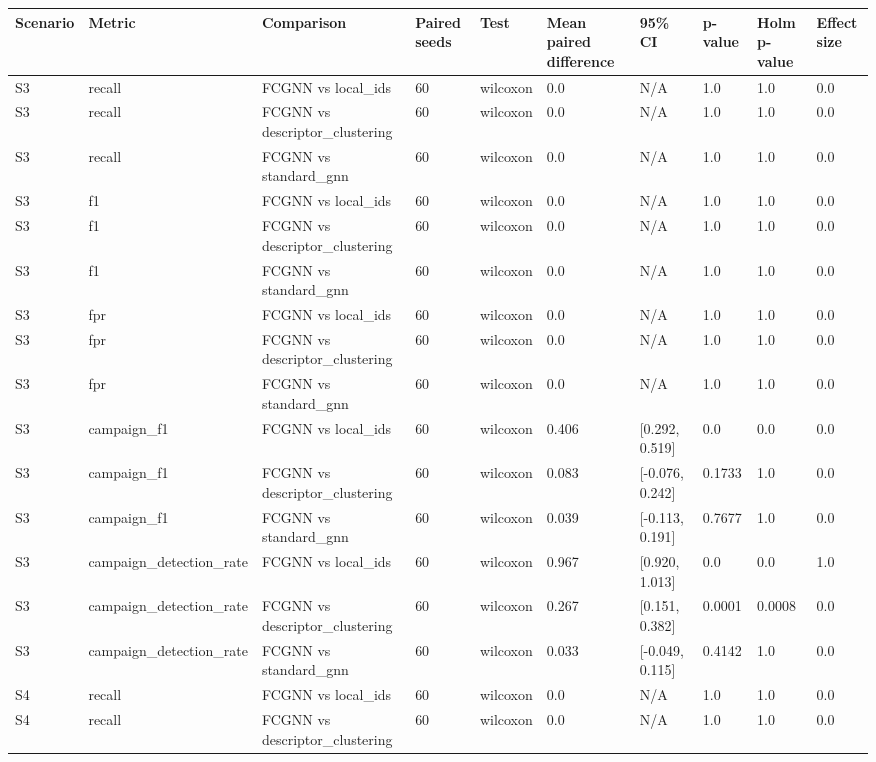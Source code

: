 \begin{table}[t]
\centering
\begin{tabular}{llllllllll}
\toprule
Scenario & Metric & Comparison & Paired seeds & Test & Mean paired difference & 95\% CI & p-value & Holm p-value & Effect size \\
\midrule
S3 & recall & FCGNN vs local\_ids & 60 & wilcoxon & 0.0 & N/A & 1.0 & 1.0 & 0.0 \\
S3 & recall & FCGNN vs descriptor\_clustering & 60 & wilcoxon & 0.0 & N/A & 1.0 & 1.0 & 0.0 \\
S3 & recall & FCGNN vs standard\_gnn & 60 & wilcoxon & 0.0 & N/A & 1.0 & 1.0 & 0.0 \\
S3 & f1 & FCGNN vs local\_ids & 60 & wilcoxon & 0.0 & N/A & 1.0 & 1.0 & 0.0 \\
S3 & f1 & FCGNN vs descriptor\_clustering & 60 & wilcoxon & 0.0 & N/A & 1.0 & 1.0 & 0.0 \\
S3 & f1 & FCGNN vs standard\_gnn & 60 & wilcoxon & 0.0 & N/A & 1.0 & 1.0 & 0.0 \\
S3 & fpr & FCGNN vs local\_ids & 60 & wilcoxon & 0.0 & N/A & 1.0 & 1.0 & 0.0 \\
S3 & fpr & FCGNN vs descriptor\_clustering & 60 & wilcoxon & 0.0 & N/A & 1.0 & 1.0 & 0.0 \\
S3 & fpr & FCGNN vs standard\_gnn & 60 & wilcoxon & 0.0 & N/A & 1.0 & 1.0 & 0.0 \\
S3 & campaign\_f1 & FCGNN vs local\_ids & 60 & wilcoxon & 0.406 & [0.292, 0.519] & 0.0 & 0.0 & 0.0 \\
S3 & campaign\_f1 & FCGNN vs descriptor\_clustering & 60 & wilcoxon & 0.083 & [-0.076, 0.242] & 0.1733 & 1.0 & 0.0 \\
S3 & campaign\_f1 & FCGNN vs standard\_gnn & 60 & wilcoxon & 0.039 & [-0.113, 0.191] & 0.7677 & 1.0 & 0.0 \\
S3 & campaign\_detection\_rate & FCGNN vs local\_ids & 60 & wilcoxon & 0.967 & [0.920, 1.013] & 0.0 & 0.0 & 1.0 \\
S3 & campaign\_detection\_rate & FCGNN vs descriptor\_clustering & 60 & wilcoxon & 0.267 & [0.151, 0.382] & 0.0001 & 0.0008 & 0.0 \\
S3 & campaign\_detection\_rate & FCGNN vs standard\_gnn & 60 & wilcoxon & 0.033 & [-0.049, 0.115] & 0.4142 & 1.0 & 0.0 \\
S4 & recall & FCGNN vs local\_ids & 60 & wilcoxon & 0.0 & N/A & 1.0 & 1.0 & 0.0 \\
S4 & recall & FCGNN vs descriptor\_clustering & 60 & wilcoxon & 0.0 & N/A & 1.0 & 1.0 & 0.0 \\

\end{tabular}
\end{table}
